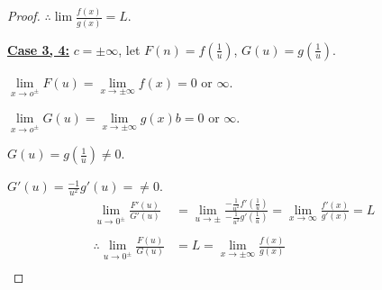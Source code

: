 \documentclass[12pt]{article}
\theoremstyle{plain}
\newcommand{\dlim}{\displaystyle\lim\limits}
\begin{document}
\begin{proof}
	$\therefore \dlim \frac{f(x)}{g(x)} = L$.


	\textbf{\underline{Case 3, 4:}} \quad
	$c = \pm \infty$, let $F(n) = f(\frac1u)$, 
	$G(u) = g(\frac1u)$.

	$\dlim_{x\to o^{\pm}} F(u) =\dlim_{x\to \pm \infty} f(x) = 0$ or $\infty$.

	$\dlim_{x\to o^{\pm}} G(u) = \dlim_{x\to \pm \infty} g(x)b=0$ or $\infty$.

	$G(u) = g(\frac 1u) \neq 0$. 
	
	$G'(u) = \frac{-1}{u^2}g'(u)=\neq 0$. 
	\begin{align*}
		\dlim_{u\to 0^{\pm}} \frac{F'(u)}{G'(u)} 
			&= \dlim_{u\to \pm}
			\frac{-\frac1{u^2}f'(\frac1u)}{-\frac{1}{u^2}g'(\frac1u)}
			= \dlim_{x\to\infty} \frac{f'(x)}{g'(x)} = L\\\\
			\therefore \dlim_{u\to 0^{\pm}}\frac{F(u)}{G(u)}
			&= L = \dlim_{x\to\pm \infty} \frac{f(x)}{g(x)}\\
	\end{align*}
	\end{proof}
\end{document}
